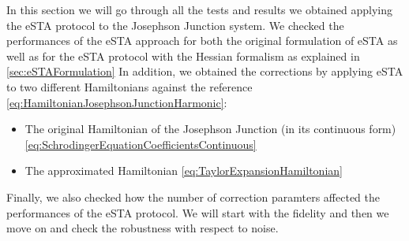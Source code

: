In this section we will go through all the tests and results we obtained applying the eSTA protocol to the Josephson Junction system.
We checked the performances of the eSTA approach for both the original formulation of eSTA as well as for the eSTA protocol with the Hessian formalism as explained in \cref{sec:eSTAFormulation}
In addition, we obtained the corrections by applying eSTA to two different Hamiltonians against the reference \cref{eq:HamiltonianJosephsonJunctionHarmonic}:
\begin{itemize}
	\item The original Hamiltonian of the Josephson Junction (in its continuous form) \cref{eq:SchrodingerEquationCoefficientsContinuous}
	\item The approximated Hamiltonian \cref{eq:TaylorExpansionHamiltonian}
\end{itemize}
Finally, we also checked how the number of correction paramters affected the performances of the eSTA protocol.
We will start with the fidelity and then we move on and check the robustness with respect to noise.
